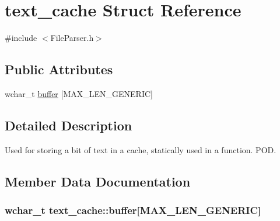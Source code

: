 \section{text\-\_\-cache Struct Reference}
\label{structtext__cache}


{\ttfamily \#include $<$File\-Parser.\-h$>$}

\subsection*{Public Attributes}
\begin{DoxyCompactItemize}
\item 
wchar\-\_\-t \hyperlink{structtext__cache_a825fb02928596f13c23262612acfee6d}{buffer} \mbox{[}M\-A\-X\-\_\-\-L\-E\-N\-\_\-\-G\-E\-N\-E\-R\-I\-C\mbox{]}
\end{DoxyCompactItemize}


\subsection{Detailed Description}
Used for storing a bit of text in a cache, statically used in a function. P\-O\-D. 

\subsection{Member Data Documentation}
\subsubsection[{buffer}]{\setlength{\rightskip}{0pt plus 5cm}wchar\-\_\-t text\-\_\-cache\-::buffer\mbox{[}M\-A\-X\-\_\-\-L\-E\-N\-\_\-\-G\-E\-N\-E\-R\-I\-C\mbox{]}}\label{structtext__cache_a825fb02928596f13c23262612acfee6d}
